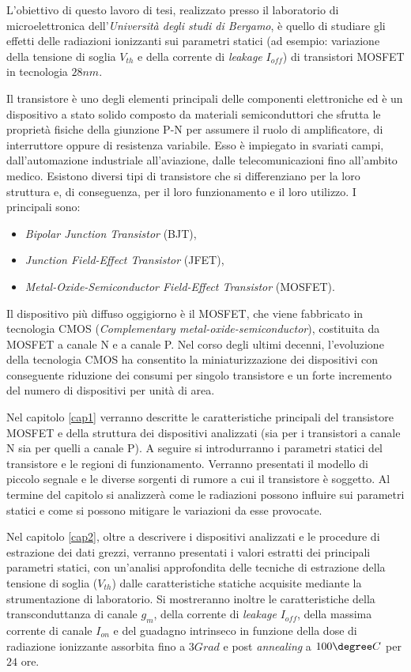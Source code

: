 L'obiettivo di questo lavoro di tesi, realizzato presso il laboratorio di microelettronica dell'\textit{Università degli studi di Bergamo}, è quello di studiare gli effetti delle radiazioni ionizzanti sui parametri statici (ad esempio: variazione della tensione di soglia $V_{th}$ e della corrente di \emph{leakage} $I_{off}$) di transistori MOSFET in tecnologia $28nm$. 

\vspace*{0.5cm}

Il transistore è uno degli elementi principali delle componenti elettroniche ed è un dispositivo a stato solido composto da materiali semiconduttori che sfrutta le proprietà fisiche della giunzione P-N per assumere il ruolo di amplificatore, di interruttore oppure di resistenza variabile.
Esso è impiegato in svariati campi, dall'automazione industriale all'aviazione, dalle telecomunicazioni fino all'ambito medico.
Esistono diversi tipi di transistore che si differenziano per la loro struttura e, di conseguenza, per il loro funzionamento e il loro utilizzo. I principali sono:
\begin{itemize}
    \item \textit{Bipolar Junction Transistor} (BJT),
    \item \textit{Junction Field-Effect Transistor} (JFET),
    \item \textit{Metal-Oxide-Semiconductor Field-Effect Transistor} (MOSFET).
\end{itemize}
Il dispositivo più diffuso oggigiorno è il MOSFET, che viene fabbricato in tecnologia CMOS (\textit{Complementary metal-oxide-semiconductor}), costituita da MOSFET a canale N e a canale P. Nel corso degli ultimi decenni, l'evoluzione della tecnologia CMOS ha consentito la miniaturizzazione dei dispositivi con conseguente riduzione dei consumi per singolo transistore e un forte incremento del numero di dispositivi per unità di area.

\vspace*{0.5cm}

Nel capitolo \ref{cap1} verranno descritte le caratteristiche principali del transistore MOSFET e della struttura dei dispositivi analizzati (sia per i transistori a canale N sia per quelli a canale P). A seguire si introdurranno i parametri statici del transistore e le regioni di funzionamento. Verranno presentati il modello di piccolo segnale e le diverse sorgenti di rumore a cui il transistore è soggetto. Al termine del capitolo si analizzerà come le radiazioni possono influire sui parametri statici e come si possono mitigare le variazioni da esse provocate.

Nel capitolo \ref{cap2}, oltre a descrivere i dispositivi analizzati e le procedure di estrazione dei dati grezzi, verranno presentati i valori estratti dei principali parametri statici, con un'analisi approfondita delle tecniche di estrazione della tensione di soglia ($V_{th}$) dalle caratteristiche statiche acquisite mediante la strumentazione di laboratorio. Si mostreranno inoltre le caratteristiche della transconduttanza di canale $g_m$, della corrente di \emph{leakage} $I_{off}$, della massima corrente di canale $I_{on}$ e del guadagno intrinseco in funzione della dose di radiazione ionizzante assorbita fino a $3 Grad$ e post \emph{annealing} a $100\degree C$ per $24$ ore.
